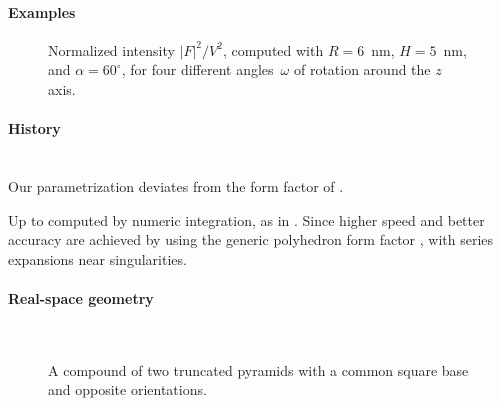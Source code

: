 \paragraph{Examples}\strut

\begin{figure}[H]
\begin{center}
\end{center}
\caption{Normalized intensity $|F|^2/V^2$,
computed with $R=6$~nm, $H=5$~nm, and $\alpha=60^\circ$,
for four different angles~$\omega$ of rotation around the $z$ axis.}
\end{figure}

\paragraph{History}\strut\\
Our parametrization deviates from the form factor  of \IsGISAXS
\cite[Eq.~2.32]{Laz06} \cite[Eq.~222]{ReLL09}.

Up to  computed by numeric integration, as in \IsGISAXS.
Since  higher speed and better accuracy are achieved
by using the generic polyhedron form factor \cite{Wut17},
with series expansions near singularities.

 \label{SCuboctahedron}

\paragraph{Real-space geometry}\strut\\

\begin{figure}[H]
\hfill
{}
\hfill
{}
\hfill
{}
\hfill
\caption{A compound of two truncated pyramids with a common square base
and opposite orientations.}
\end{figure}

\FloatBarrier

